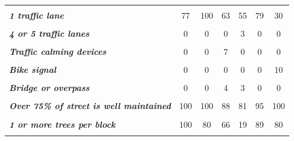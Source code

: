 \documentclass[]{elsarticle} %
\begin{document}
\begin{table}
{\begin{tabular}[t]{>{}lcccccc}
\em{\textbf{\cellcolor{gray!6}{Road is under repair}}} & \cellcolor{gray!6}{0} & \cellcolor{gray!6}{0} & \cellcolor{gray!6}{0} & \cellcolor{gray!6}{16} & \cellcolor{gray!6}{0} & \cellcolor{gray!6}{0}\\
\em{\textbf{1 traffic lane}} & 77 & 100 & 63 & 55 & 79 & 30\\
\addlinespace
\em{\textbf{\cellcolor{gray!6}{2 or 3 traffic lanes}}} & \cellcolor{gray!6}{23} & \cellcolor{gray!6}{0} & \cellcolor{gray!6}{19} & \cellcolor{gray!6}{42} & \cellcolor{gray!6}{21} & \cellcolor{gray!6}{70}\\
\em{\textbf{4 or 5 traffic lanes}} & 0 & 0 & 0 & 3 & 0 & 0\\
\em{\textbf{\cellcolor{gray!6}{6 or more lanes}}} & \cellcolor{gray!6}{0} & \cellcolor{gray!6}{0} & \cellcolor{gray!6}{0} & \cellcolor{gray!6}{0} & \cellcolor{gray!6}{0} & \cellcolor{gray!6}{0}\\
\em{\textbf{Traffic calming devices}} & 0 & 0 & 7 & 0 & 0 & 0\\
\em{\textbf{\cellcolor{gray!6}{Traffic signal}}} & \cellcolor{gray!6}{23} & \cellcolor{gray!6}{10} & \cellcolor{gray!6}{22} & \cellcolor{gray!6}{13} & \cellcolor{gray!6}{11} & \cellcolor{gray!6}{80}\\
\addlinespace
\em{\textbf{Bike signal}} & 0 & 0 & 0 & 0 & 0 & 10\\
\em{\textbf{\cellcolor{gray!6}{Bike box}}} & \cellcolor{gray!6}{0} & \cellcolor{gray!6}{0} & \cellcolor{gray!6}{0} & \cellcolor{gray!6}{0} & \cellcolor{gray!6}{0} & \cellcolor{gray!6}{15}\\
\em{\textbf{Bridge or overpass}} & 0 & 0 & 4 & 3 & 0 & 0\\
\em{\textbf{\cellcolor{gray!6}{Streetlights are present}}} & \cellcolor{gray!6}{31} & \cellcolor{gray!6}{60} & \cellcolor{gray!6}{59} & \cellcolor{gray!6}{19} & \cellcolor{gray!6}{21} & \cellcolor{gray!6}{50}\\
\em{\textbf{Over 75\% of street is well maintained}} & 100 & 100 & 88 & 81 & 95 & 100\\
\addlinespace
\em{\textbf{\cellcolor{gray!6}{Street is clean (no litter, graffiti, etc.)}}} & \cellcolor{gray!6}{100} & \cellcolor{gray!6}{100} & \cellcolor{gray!6}{100} & \cellcolor{gray!6}{97} & \cellcolor{gray!6}{84} & \cellcolor{gray!6}{100}\\
\em{\textbf{1 or more trees per block}} & 100 & 80 & 66 & 19 & 89 & 80\\
\em{\textbf{\cellcolor{gray!6}{Approx 1 tree for every 2 blocks}}} & \cellcolor{gray!6}{0} & \cellcolor{gray!6}{0} & \cellcolor{gray!6}{4} & \cellcolor{gray!6}{20} & \cellcolor{gray!6}{0} & \cellcolor{gray!6}{0}\\

\end{tabular}}
\end{table}
\end{document}
